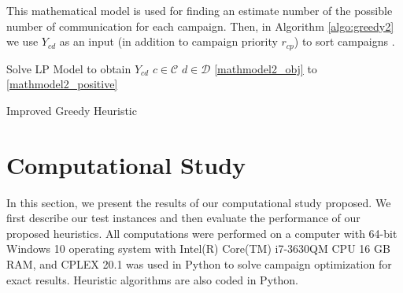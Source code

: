 \documentclass[11pt]{article}
\begin{document}
This mathematical model is used for finding an estimate number of the possible number of communication for each campaign. Then, in Algorithm \ref{algo:greedy2} we use $Y_{{c}{d}}$ as an input (in addition to campaign priority $r_{{c}{p}}$) to sort campaigns .

\begin{singlespace}
\begin{algorithm}[H]
\DontPrintSemicolon
{}

Solve LP Model to obtain $Y_{{c}{d}}$ $c\in\mathcal{C}$ $d\in\mathcal{D}$
\eqref{mathmodel2_obj} to \eqref{mathmodel2_positive}

\caption{Improved Greedy Heuristic}
\label{algo:greedy2}
\end{algorithm}
\end{singlespace}

\newpage
\section{Computational Study} \label{s:num-analysis}

In this section, we present the results of our computational study proposed. We first describe our test instances and then evaluate the performance of our proposed heuristics. All computations were performed on a computer with 64-bit Windows 10 operating system with Intel(R) Core(TM) i7-3630QM CPU 16 GB RAM, and CPLEX 20.1 was used in Python to solve campaign optimization for exact results. Heuristic algorithms are also coded in Python.
\end{document}
